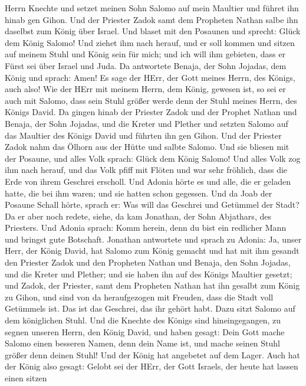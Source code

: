Herrn Knechte und setzet meinen Sohn Salomo auf mein Maultier und führet
ihn hinab gen Gihon.  Und der Priester Zadok samt dem
Propheten Nathan salbe ihn daselbst zum König über Israel. Und blaset
mit den Posaunen und sprecht: Glück dem König Salomo!  Und
ziehet ihm nach herauf, und er soll kommen und sitzen auf meinem Stuhl
und König sein für mich; und ich will ihm gebieten, dass er Fürst sei
über Israel und Juda.  Da antwortete Benaja, der Sohn
Jojadas, dem König und sprach: Amen! Es sage der HErr, der Gott meines
Herrn, des Königs, auch also!  Wie der HErr mit meinem
Herrn, dem König, gewesen ist, so sei er auch mit Salomo, dass sein
Stuhl größer werde denn der Stuhl meines Herrn, des Königs David.
 Da gingen hinab der Priester Zadok und der Prophet Nathan
und Benaja, der Sohn Jojadas, und die Kreter und Plether und setzten
Salomo auf das Maultier des Königs David und führten ihn gen Gihon.
 Und der Priester Zadok nahm das Ölhorn aus der Hütte und
salbte Salomo. Und sie bliesen mit der Posaune, und alles Volk sprach:
Glück dem König Salomo!  Und alles Volk zog ihm nach
herauf, und das Volk pfiff mit Flöten und war sehr fröhlich, dass die
Erde von ihrem Geschrei erscholl.  Und Adonia hörte es und
alle, die er geladen hatte, die bei ihm waren; und sie hatten schon
gegessen. Und da Joab der Posaune Schall hörte, sprach er: Was will das
Geschrei und Getümmel der Stadt?  Da er aber noch redete,
siehe, da kam Jonathan, der Sohn Abjathars, des Priesters. Und Adonia
sprach: Komm herein, denn du bist ein redlicher Mann und bringst gute
Botschaft.  Jonathan antwortete und sprach zu Adonia: Ja,
unser Herr, der König David, hat Salomo zum König gemacht 
und hat mit ihm gesandt den Priester Zadok und den Propheten Nathan und
Benaja, den Sohn Jojadas, und die Kreter und Plether; und sie haben ihn
auf des Königs Maultier gesetzt;  und Zadok, der Priester,
samt dem Propheten Nathan hat ihn gesalbt zum König zu Gihon, und sind
von da heraufgezogen mit Freuden, dass die Stadt voll Getümmels ist. Das
ist das Geschrei, das ihr gehört habt.  Dazu sitzt Salomo
auf dem königlichen Stuhl.  Und die Knechte des Königs sind
hineingegangen, zu segnen unseren Herrn, den König David, und haben
gesagt: Dein Gott mache Salomo einen besseren Namen, denn dein Name ist,
und mache seinen Stuhl größer denn deinen Stuhl! Und der König hat
angebetet auf dem Lager.  Auch hat der König also gesagt:
Gelobt sei der HErr, der Gott Israels, der heute hat lassen einen sitzen
